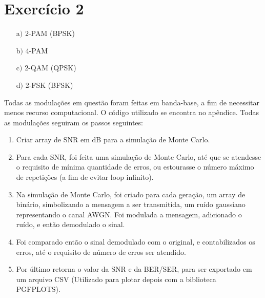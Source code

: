 \documentclass[10pt,two column,a4paper]{article}
\begin{document}
	\section{Exercício 2}
	\begin{enumerate}
		\item[a$)$] 2-PAM (BPSK)
		\item[b$)$] 4-PAM
		\item[c$)$] 2-QAM (QPSK)
		\item[d$)$] 2-FSK (BFSK)\end{enumerate}	
	Todas as modulações em questão foram feitas em banda-base, a fim de necessitar menos recurso computacional. O código utilizado se encontra no apêndice.
	Todas as modulações seguiram os passos seguintes:
	\begin{enumerate}
		\item Criar array de SNR em dB para a simulação de Monte Carlo.
		\item Para cada SNR, foi feita uma simulação de Monte Carlo, até que se atendesse o requisito de mínima quantidade de erros, ou estourasse o número máximo de repetições (a fim de evitar loop infinito).
		\item Na simulação de Monte Carlo, foi criado para cada geração, um array de binário, simbolizando a mensagem a ser transmitida, um ruído gaussiano representando o canal AWGN. Foi modulada a mensagem, adicionado o ruído, e então demodulado o sinal.
		\item Foi comparado então o sinal demodulado com o original, e contabilizados os erros, até o requisito de número de erros ser atendido.
		\item Por último retorna o valor da SNR e da BER/SER, para ser exportado em um arquivo CSV (Utilizado para plotar depois com a biblioteca PGFPLOTS).
	\end{enumerate}
\end{document}
